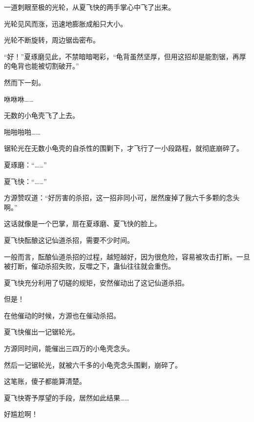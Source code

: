 \begin{this_body}
一道刺眼至极的光轮，从夏飞快的两手掌心中飞了出来。

光轮见风而涨，迅速地膨胀成船只大小。

光轮不断旋转，周边锯齿密布。

“好！”夏琢磨见此，不禁暗暗喝彩，“龟背虽然坚厚，但用这招却是能割锯，再厚的龟背也能被切割破开。”

然而下一刻。

咻咻咻……

无数的小龟壳飞了上去。

啪啪啪啪……

锯轮光在无数小龟壳的自杀性的围剿下，才飞行了一小段路程，就彻底崩碎了。

夏琢磨：“……”

夏飞快：“……”

方源赞叹道：“好厉害的杀招，这一招非同小可，居然废掉了我六千多颗的念头啊。”

这话就像是一个巴掌，扇在夏琢磨、夏飞快的脸上。

夏飞快酝酿这记仙道杀招，需要不少时间。

一般而言，酝酿仙道杀招的过程，越短越好，因为很危险，容易被攻击打断。一旦被打断，催动杀招失败，反噬之下，蛊仙往往就会重伤。

夏飞快充分利用了切磋的规矩，安然催动出了这记仙道杀招。

但是！

在他催动的时候，方源也在催动杀招。

夏飞快催出一记锯轮光。

方源同时间，能催出三四万的小龟壳念头。

然后一记锯轮光，就被六千多的小龟壳念头围剿，崩碎了。

这笔账，傻子都能算清楚。

夏飞快寄予厚望的手段，居然如此结果……

好尴尬啊！

\end{this_body}

